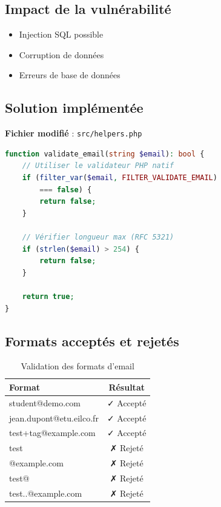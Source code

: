 \documentclass[11pt,a4paper,french]{report}
\begin{document}
\subsection{Impact de la vulnérabilité}

\begin{itemize}
    \item Injection SQL possible
    \item Corruption de données
    \item Erreurs de base de données
\end{itemize}

\subsection{Solution implémentée}

\textbf{Fichier modifié} : \texttt{src/helpers.php}

\begin{lstlisting}[language=PHP]
function validate_email(string $email): bool {
    // Utiliser le validateur PHP natif
    if (filter_var($email, FILTER_VALIDATE_EMAIL) 
        === false) {
        return false;
    }
    
    // Vérifier longueur max (RFC 5321)
    if (strlen($email) > 254) {
        return false;
    }
    
    return true;
}
\end{lstlisting}

\subsection{Formats acceptés et rejetés}

\begin{table}[H]
\centering
\caption{Validation des formats d'email}
\begin{tabular}{|l|c|}
\hline
\textbf{Format} & \textbf{Résultat} \\
\hline
student@demo.com & ✓ Accepté \\
\hline
jean.dupont@etu.eilco.fr & ✓ Accepté \\
\hline
test+tag@example.com & ✓ Accepté \\
\hline
test & ✗ Rejeté \\
\hline
@example.com & ✗ Rejeté \\
\hline
test@ & ✗ Rejeté \\
\hline
test..@example.com & ✗ Rejeté \\
\hline
\end{tabular}
\end{table}
\end{document}
